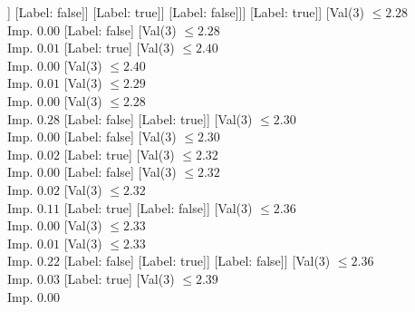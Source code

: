 \documentclass[margin=10pt]{standalone}
\begin{document}
\begin{forest}
									[Val($3$) $ \leq 2.23$ \\ Imp. $0.05$
										[Val($3$) $ \leq 2.21$ \\ Imp. $0.01$
											[Label: false]
											[Val($3$) $ \leq 2.22$ \\ Imp. $0.04$
												[Val($3$) $ \leq 2.22$ \\ Imp. $0.11$
													[Val($3$) $ \leq 2.21$ \\ Imp. $0.08$
														[Val($3$) $ \leq 2.21$ \\ Imp. $0.18$
															[Label: false]
															[Label: true]]
														[Label: false]]
													[Label: true]]
												[Label: false]]]
										[Label: true]]
									[Val($3$) $ \leq 2.28$ \\ Imp. $0.00$
										[Label: false]
										[Val($3$) $ \leq 2.28$ \\ Imp. $0.01$
											[Label: true]
											[Val($3$) $ \leq 2.40$ \\ Imp. $0.00$
												[Val($3$) $ \leq 2.40$ \\ Imp. $0.01$
													[Val($3$) $ \leq 2.29$ \\ Imp. $0.00$
														[Val($3$) $ \leq 2.28$ \\ Imp. $0.28$
															[Label: false]
															[Label: true]]
														[Val($3$) $ \leq 2.30$ \\ Imp. $0.00$
															[Label: false]
															[Val($3$) $ \leq 2.30$ \\ Imp. $0.02$
																[Label: true]
																[Val($3$) $ \leq 2.32$ \\ Imp. $0.00$
																	[Label: false]
																	[Val($3$) $ \leq 2.32$ \\ Imp. $0.02$
																		[Val($3$) $ \leq 2.32$ \\ Imp. $0.11$
																			[Label: true]
																			[Label: false]]
																		[Val($3$) $ \leq 2.36$ \\ Imp. $0.00$
																			[Val($3$) $ \leq 2.33$ \\ Imp. $0.01$
																				[Val($3$) $ \leq 2.33$ \\ Imp. $0.22$
																					[Label: false]
																					[Label: true]]
																				[Label: false]]
																			[Val($3$) $ \leq 2.36$ \\ Imp. $0.03$
																				[Label: true]
																				[Val($3$) $ \leq 2.39$ \\ Imp. $0.00$

\end{forest}
\end{document}
